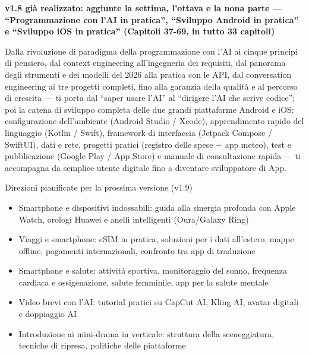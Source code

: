 

\textbf{v1.8 già realizzato: aggiunte la settima, l'ottava e la nona parte — “Programmazione con l'AI in pratica”, “Sviluppo Android in pratica” e “Sviluppo iOS in pratica” (Capitoli 37-69, in tutto 33 capitoli)}\par

Dalla rivoluzione di paradigma della programmazione con l'AI ai cinque principi di pensiero, dal context engineering all'ingegneria dei requisiti, dal panorama degli strumenti e dei modelli del 2026 alla pratica con le API, dal conversation engineering ai tre progetti completi, fino alla garanzia della qualità e al percorso di crescita — ti porta dal “saper usare l'AI” al “dirigere l'AI che scrive codice”; poi la catena di sviluppo completa delle due grandi piattaforme Android e iOS: configurazione dell'ambiente (Android Studio / Xcode), apprendimento rapido del linguaggio (Kotlin / Swift), framework di interfaccia (Jetpack Compose / SwiftUI), dati e rete, progetti pratici (registro delle spese + app meteo), test e pubblicazione (Google Play / App Store) e manuale di consultazione rapida — ti accompagna da semplice utente digitale fino a diventare sviluppatore di App.

\begin{tcbinfo}{Direzioni pianificate per la prossima versione (v1.9)}
\begin{itemize}
  \item Smartphone e dispositivi indossabili: guida alla sinergia profonda con Apple Watch, orologi Huawei e anelli intelligenti (Oura/Galaxy Ring)
  \item Viaggi e smartphone: eSIM in pratica, soluzioni per i dati all'estero, mappe offline, pagamenti internazionali, confronto tra app di traduzione
  \item Smartphone e salute: attività sportiva, monitoraggio del sonno, frequenza cardiaca e ossigenazione, salute femminile, app per la salute mentale
  \item Video brevi con l'AI: tutorial pratici su CapCut AI, Kling AI, avatar digitali e doppiaggio AI
  \item Introduzione ai mini-drama in verticale: struttura della sceneggiatura, tecniche di ripresa, politiche delle piattaforme
\end{itemize}

\end{tcbinfo}

